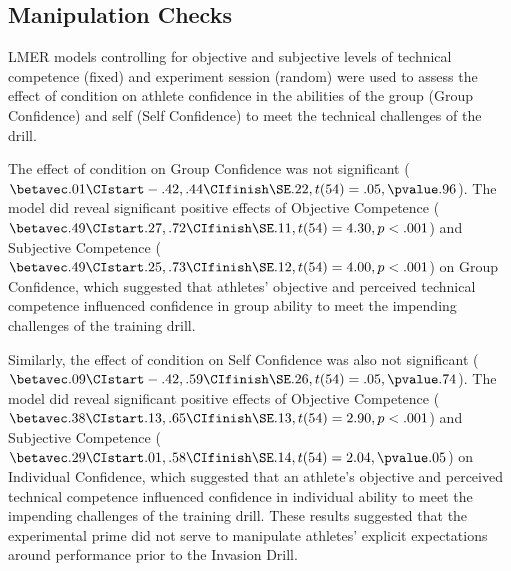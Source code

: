 



\subsection{Manipulation Checks}

LMER models controlling for objective and subjective levels of technical competence (fixed) and experiment session (random) were used to assess the effect of condition on athlete confidence in the abilities of the group (Group Confidence) and self (Self Confidence) to meet the technical challenges of the drill.

The effect of condition on Group Confidence was not significant ($\betavec .01 \CIstart -.42, .44 \CIfinish \SE .22, t(54)= .05, \pvalue .96$). The model did reveal significant positive effects of Objective Competence ($\betavec .49 \CIstart .27, .72 \CIfinish \SE .11, t(54)= 4.30, p <.001$) and Subjective Competence ($\betavec .49 \CIstart .25, .73 \CIfinish \SE .12, t(54)= 4.00, p < .001$) on Group Confidence, which suggested that athletes' objective and perceived technical competence influenced confidence in group ability to meet the impending challenges of the training drill.

Similarly, the effect of condition on Self Confidence was also not significant ($\betavec .09 \CIstart -.42, .59 \CIfinish \SE .26, t(54)= .05, \pvalue .74$).
The model did reveal significant positive effects of Objective Competence ($\betavec .38 \CIstart .13, .65 \CIfinish \SE .13, t(54)= 2.90, p <.001$) and Subjective Competence ($\betavec .29 \CIstart .01, .58 \CIfinish \SE .14, t(54)= 2.04, \pvalue .05$) on Individual Confidence, which suggested that an athlete's objective and perceived technical competence influenced confidence in individual ability to meet the impending challenges of the training drill.  These results suggested that the experimental prime did not serve to manipulate athletes' explicit expectations around performance prior to the Invasion Drill.

